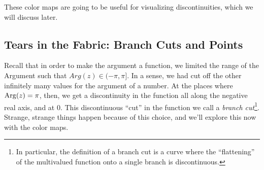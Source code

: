 These color maps are going to be useful for visualizing discontinuities, which we will discuss later.


\subsection{Tears in the Fabric: Branch Cuts and Points}

Recall that in order to make the argument a function, we limited the range of the Argument such that $Arg(z) \in (-\pi, \pi]$. In a sense, we had cut off the other infinitely many values for the argument of a number. At the places where $\operatorname*{Arg}(z) = \pi$, then, we get a discontinuity in the function all along the negative real axis, and at 0. This discontinuous ``cut'' in the function we call a \textit{branch cut}\footnote{In particular, the definition of a branch cut is a curve where the ``flattening'' of the multivalued function onto a single branch is discontinuous.}. Strange, strange things happen because of this choice, and we'll explore this now with the color maps.

